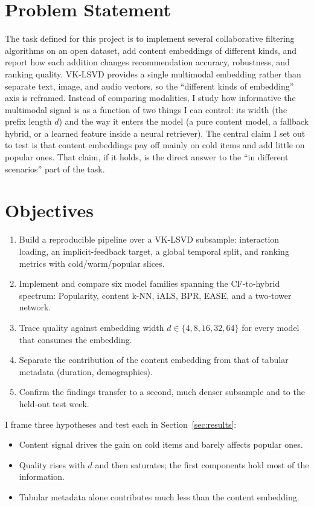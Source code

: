 \documentclass[11pt,a4paper]{article}
\begin{document}
\section{Problem Statement}
The task defined for this project is to implement several collaborative filtering
algorithms on an open dataset, add content embeddings of different kinds, and report how
each addition changes recommendation accuracy, robustness, and ranking quality. VK-LSVD
provides a single multimodal embedding rather than separate text, image, and audio
vectors, so the ``different kinds of embedding'' axis is reframed. Instead of comparing
modalities, I study how informative the multimodal signal is as a function of two things
I can control: its width (the prefix length $d$) and the way it enters the model (a pure
content model, a fallback hybrid, or a learned feature inside a neural retriever). The
central claim I set out to test is that content embeddings pay off mainly on cold items
and add little on popular ones. That claim, if it holds, is the direct answer to the
``in different scenarios'' part of the task.

\section{Objectives}
\begin{enumerate}[label=\textbf{O\arabic*.},leftmargin=2.4em]
  \item Build a reproducible pipeline over a VK-LSVD subsample: interaction loading, an
        implicit-feedback target, a global temporal split, and ranking metrics with
        cold/warm/popular slices.
  \item Implement and compare six model families spanning the CF-to-hybrid spectrum:
        Popularity, content k-NN, iALS, BPR, EASE, and a two-tower network.
  \item Trace quality against embedding width $d\in\{4,8,16,32,64\}$ for every model
        that consumes the embedding.
  \item Separate the contribution of the content embedding from that of tabular
        metadata (duration, demographics).
  \item Confirm the findings transfer to a second, much denser subsample and to the
        held-out test week.
\end{enumerate}

\noindent I frame three hypotheses and test each in Section~\ref{sec:results}:
\begin{itemize}
  \item[\textbf{H1.}] Content signal drives the gain on cold items and barely affects
        popular ones.
  \item[\textbf{H2.}] Quality rises with $d$ and then saturates; the first components
        hold most of the information.
  \item[\textbf{H3.}] Tabular metadata alone contributes much less than the content
        embedding.
\end{itemize}
\end{document}

